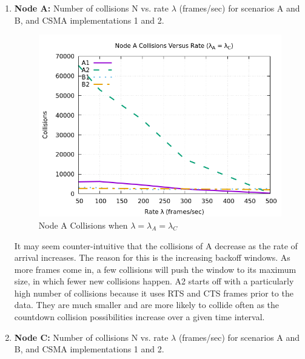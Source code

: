 \documentclass[12pt]{article}
\begin{document}
    \begin{enumerate}
    
        \item {
            {\bf Node A:} Number of collisions N vs. rate \(\lambda{}\) (frames/sec) for scenarios A and B, and CSMA implementations 1 and 2.
            
            \begin{figure}[!htb]
                \centering
                \includegraphics[width=5in]{2A.png}
                \caption{Node A Collisions when \(\lambda{} = \lambda{}_A = \lambda{}_C\) }
                \label{fig:2A}
            \end{figure}

            It may seem counter-intuitive that the collisions of A decrease as the rate of arrival increases. The reason for this is the increasing backoff windows. As more frames come in, a few collisions will push the window to its maximum size, in which fewer new collisions happen. A2 starts off with a particularly high number of collisions because it uses RTS and CTS frames prior to the data. They are much smaller and are more likely to collide often as the countdown collision possibilities increase over a given time interval.  
        }    
    
    
\clearpage  
        \item {
            {\bf Node C:} Number of collisions N vs. rate \(\lambda{}\) (frames/sec) for scenarios A and B, and CSMA implementations 1 and 2.
            
}
\end{enumerate}
\end{document}
